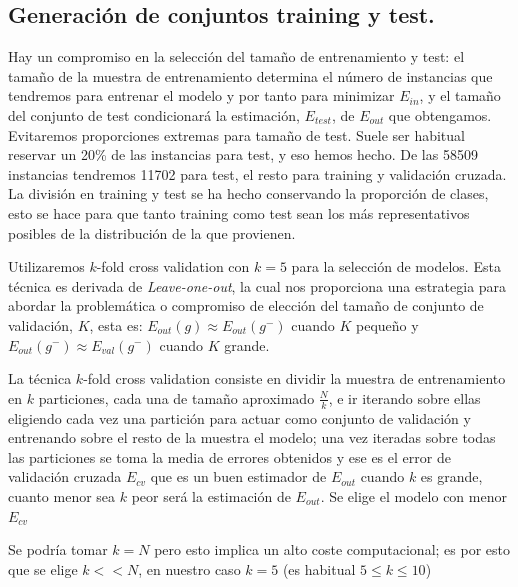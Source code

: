 \documentclass[11pt,a4paper]{article}
\theoremstyle{definition}
\begin{document}
	\subsection{Generación de conjuntos training y test.}
	Hay un compromiso en la selección del tamaño de entrenamiento y test: el tamaño de la muestra de entrenamiento determina el número de instancias que tendremos para entrenar el modelo y por tanto para minimizar $E_{in}$, y el  tamaño del conjunto de test condicionará la estimación, $E_{test}$, de $E_{out}$ que obtengamos. Evitaremos proporciones extremas para tamaño de test. Suele ser habitual reservar un 20\% de las instancias para test, y eso hemos hecho. De las 58509 instancias tendremos 11702 para test, el resto para training y validación cruzada. La división en training y test se ha hecho conservando la proporción de clases, esto se hace para que tanto training como test sean los más representativos posibles de la distribución de la que provienen.
	
	Utilizaremos $k$-fold cross validation con $k=5$ para la selección de modelos. Esta técnica es derivada de \textit{Leave-one-out}, la cual nos proporciona una estrategia para abordar la problemática o compromiso de elección del tamaño de conjunto de validación, $K$, esta es: $E_{out}(g)\approx E_{out}(g^-)$ cuando $K$ pequeño y $E_{out}(g^-)\approx E_{val}(g^-)$ cuando $K$ grande. %
	
	 La técnica $k$-fold cross validation consiste en dividir la muestra de entrenamiento en $k$ particiones, cada una de tamaño aproximado $\frac{N}{k}$, e ir iterando sobre ellas eligiendo cada vez una partición para actuar como conjunto de validación y entrenando sobre el resto de la muestra el modelo; una vez iteradas sobre todas las particiones se toma la media de errores obtenidos y ese es el error de validación cruzada $E_{cv}\iffalse=\frac{1}{N}\sum_{i=1}^N E_{val}(g_i^-)\fi$ que es un buen estimador de $E_{out}$ cuando $k$ es grande, cuanto menor sea $k$ peor será la estimación de $E_{out}$. Se elige el modelo con menor $E_{cv}$
	 
	  Se podría tomar $k=N$ pero esto implica un alto coste computacional; es por esto que se elige $k<< N$, en nuestro caso $k=5$ (es habitual $5\leq k\leq 10$)
\end{document}
